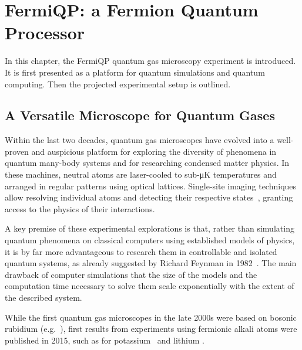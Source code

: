 \renewcommand{\imagepath}{../20-fermiqp/img}

\chapter{FermiQP: a Fermion Quantum Processor}
In this chapter, the FermiQP quantum gas microscopy experiment is introduced. It is first presented as a platform for quantum simulations and quantum computing. Then the projected experimental setup is outlined.

\section{A Versatile Microscope for Quantum Gases}\label{ch:quantum_gas_microscopy}
Within the last two decades, quantum gas microscopes have evolved into a well-proven and auspicious platform for exploring the diversity of phenomena in quantum many-body systems and for researching condensed matter physics. In these machines, neutral atoms are laser-cooled to sub-\si[]{\micro\kelvin} temperatures and arranged in regular patterns using optical lattices. Single-site imaging techniques allow resolving individual atoms and detecting their respective states~\cite{bloch_many-body_2008,gross_quantum_2017, gross_quantum_2021}, granting access to the physics of their interactions.

A key premise of these experimental explorations is that, rather than simulating quantum phenomena on classical computers using established models of physics, it is by far more advantageous to research them in controllable and isolated quantum systems, as already suggested by Richard Feynman in 1982~\cite{feynman_simulating_1982}. The main drawback of computer simulations that the size of the models and the computation time necessary to solve them scale exponentially with the extent of the described system.

While the first quantum gas microscopes in the late 2000s were based on bosonic rubidium (e.g.~\cite{sherson_single-atom-resolved_2010}), first results from experiments using fermionic alkali atoms were published in 2015, such as for potassium~\cite{cheuk_quantum-gas_2015} and lithium \cite{parsons_site-resolved_2015, omran_microscopic_2015}.

